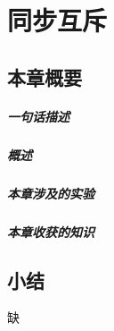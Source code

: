 \chapter{同步互斥}\label{ch_syncmutex}

\section{本章概要}

\paragraph{一句话描述}

\paragraph{概述}

\paragraph{本章涉及的实验}

\paragraph{本章收获的知识}

%
%
%
%
%
%
%


\section{小结}
缺